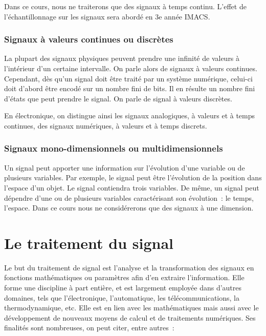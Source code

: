     
	Dans ce cours, nous ne traiterons que des signaux à temps continu. L'effet de l'échantillonnage sur les signaux sera abordé en 3e année IMACS.

	\subsubsection{Signaux à valeurs continues ou discrètes}
	
	La plupart des signaux physiques peuvent prendre une infinité de valeurs à l'intérieur d'un certaine intervalle. On parle alors de signaux à valeurs continues. Cependant, dès qu'un signal doit être traité par un système numérique, celui-ci doit d'abord être encodé sur un nombre fini de bits. Il en résulte un nombre fini d'états que peut prendre le signal. On parle de signal à valeurs discrètes.
	
	En électronique, on distingue ainsi les signaux analogiques, à valeurs et à temps continues, des signaux numériques, à valeurs et à temps discrets.
	
	\subsubsection{Signaux mono-dimensionnels ou multidimensionnels}
	Un signal peut apporter une information sur l'évolution d'une variable ou de plusieurs variables. Par exemple, le signal peut être l'évolution de la position dans l'espace d'un objet. Le signal contiendra trois variables. De même, un signal peut dépendre d'une ou de plusieurs variables caractérisant son évolution~: le temps, l'espace. Dans ce cours nous ne considérerons que des signaux à une dimension.
	

	
	
	\section{Le traitement du signal}
	
 	Le but du traitement de signal est l'analyse et la transformation des signaux en fonctions mathématiques ou paramètres afin d'en extraire l'information. Elle forme une discipline à part entière, et est largement employée dans d'autres domaines, tels que l'électronique, l'automatique, les télécommunications, la thermodynamique, etc.  Elle est en lien avec les mathématiques mais aussi avec le développement de nouveaux moyens de calcul et de traitements numériques.
	Ses finalités sont nombreuses, on peut citer, entre autres~:
	
